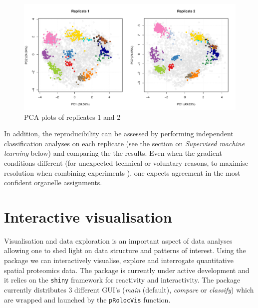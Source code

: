 \begin{figure}[!ht]
  \centering
\begin{knitrout}
\color{fgcolor}\begin{kframe}
\begin{alltt}
\hlstd{(} \hlstd{=} \hlstd{(}\hlstd{,} \hlstd{))}
\hlstd{(hl[, hl}\hlopt{$} \hlopt{==} \hlstd{],}  \hlstd{=} \hlstd{)}
\hlstd{(hl[, hl}\hlopt{$} \hlopt{==} \hlstd{],}  \hlstd{=} \hlstd{,}  \hlstd{=} \hlstd{)}
\end{alltt}
\end{kframe}
\includegraphics[width=\textwidth]{figure/plot2Drep-1} 

\end{knitrout}
  \caption{PCA plots of replicates 1 and 2}
  \label{fig:plot2Drep}
\end{figure}

In addition, the reproducibility can be assessed by performing
independent classification analyses on each replicate (see the section
on \textit{Supervised machine learning} below) and comparing the the
results. Even when the gradient conditions different (for unexpected
technical or voluntary reasons, to maximise resolution when combining
experiments \cite{Trotter:2010}), one expects agreement in the most
confident organelle assignments.

\pagebreak

\section*{Interactive visualisation}

Visualisation and data exploration is an important aspect of data
analyses allowing one to shed light on data structure and patterns of
interest. Using the  package we can interactively
visualise, explore and interrogate quantitative spatial proteomics
data. The  package is currently under active
development and it relies on the \texttt{shiny} framework for
reactivity and interactivity. The package currently distributes 3
different GUI's (\textit{main} (default), \textit{compare} or
\textit{classify}) which are wrapped and launched by the
\texttt{pRolocVis} function.


